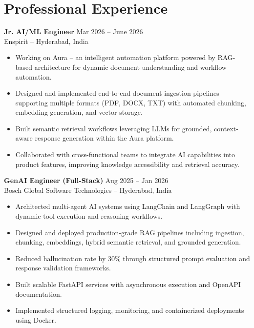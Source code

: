 \documentclass[letterpaper,11pt]{article}
\begin{document}
\section{Professional Experience}

\textbf{Jr. AI/ML Engineer} \hfill Mar 2026 -- June 2026 \\
Enspirit -- Hyderabad, India

\begin{itemize}
\item Working on Aura -- an intelligent automation platform powered by RAG-based architecture for dynamic document understanding and workflow automation.
\item Designed and implemented end-to-end document ingestion pipelines supporting multiple formats (PDF, DOCX, TXT) with automated chunking, embedding generation, and vector storage.
\item Built semantic retrieval workflows leveraging LLMs for grounded, context-aware response generation within the Aura platform.
\item Collaborated with cross-functional teams to integrate AI capabilities into product features, improving knowledge accessibility and retrieval accuracy.
\end{itemize}

\vspace{6pt}

\textbf{GenAI Engineer (Full-Stack)} \hfill Aug 2025 -- Jan 2026 \\
Bosch Global Software Technologies -- Hyderabad, India

\begin{itemize}
\item Architected multi-agent AI systems using LangChain and LangGraph with dynamic tool execution and reasoning workflows.
\item Designed and deployed production-grade RAG pipelines including ingestion, chunking, embeddings, hybrid semantic retrieval, and grounded generation.
\item Reduced hallucination rate by 30\% through structured prompt evaluation and response validation frameworks.
\item Built scalable FastAPI services with asynchronous execution and OpenAPI documentation.
\item Implemented structured logging, monitoring, and containerized deployments using Docker.
\end{itemize}
\end{document}

